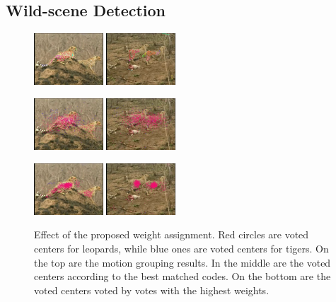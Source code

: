 \documentclass{mva2011}
\begin{document}
\subsection{Wild-scene Detection}

\begin{figure}
\centering
\includegraphics[width=0.23\textwidth,bb=0 0 640 480]{amotionimg00296.jpg}
\includegraphics[width=0.23\textwidth,bb=0 0 640 480]{amotionimg01836.jpg}

\includegraphics[width=0.23\textwidth,bb=0 0 640 480]{selectVimg00296_0.jpg}
\includegraphics[width=0.23\textwidth,bb=0 0 640 480]{selectVimg01836_0.jpg}

\includegraphics[width=0.23\textwidth,bb=0 0 640 480]{selectVimg00296_19.jpg}
\includegraphics[width=0.23\textwidth,bb=0 0 640 480]{selectVimg01836_19.jpg}

\caption{Effect of the proposed weight assignment. Red circles are voted centers for leopards, while blue ones are voted centers for tigers. On the top are the motion grouping results. In the middle are the voted centers according to the best matched codes. On the bottom are the voted centers voted by votes with the highest weights.}
\label{fig:bcMP}
\end{figure}
\end{document}
